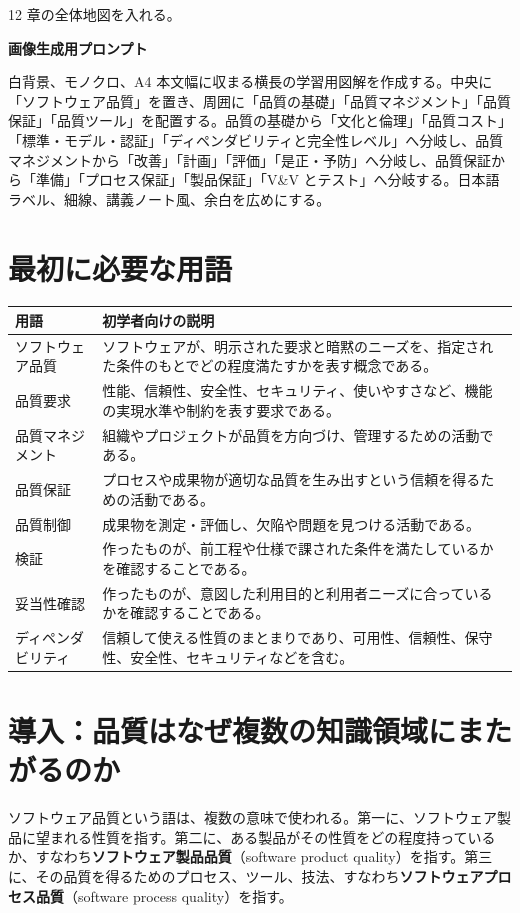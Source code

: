 \documentclass[11pt,a4paper]{article}
\newcommand{\term}[2]{\textbf{#1}（#2）}
\begin{document}
\begin{todobox}
12 章の全体地図を入れる。\par
\textbf{画像生成用プロンプト}\par
白背景、モノクロ、A4 本文幅に収まる横長の学習用図解を作成する。中央に「ソフトウェア品質」を置き、周囲に「品質の基礎」「品質マネジメント」「品質保証」「品質ツール」を配置する。品質の基礎から「文化と倫理」「品質コスト」「標準・モデル・認証」「ディペンダビリティと完全性レベル」へ分岐し、品質マネジメントから「改善」「計画」「評価」「是正・予防」へ分岐し、品質保証から「準備」「プロセス保証」「製品保証」「V\&V とテスト」へ分岐する。日本語ラベル、細線、講義ノート風、余白を広めにする。
\end{todobox}

\section*{最初に必要な用語}

\noindent\begin{tabularx}{\textwidth}{L{0.27\textwidth}Y}
\toprule
\textbf{用語} & \textbf{初学者向けの説明} \\
\midrule
ソフトウェア品質 & ソフトウェアが、明示された要求と暗黙のニーズを、指定された条件のもとでどの程度満たすかを表す概念である。 \\
品質要求 & 性能、信頼性、安全性、セキュリティ、使いやすさなど、機能の実現水準や制約を表す要求である。 \\
品質マネジメント & 組織やプロジェクトが品質を方向づけ、管理するための活動である。 \\
品質保証 & プロセスや成果物が適切な品質を生み出すという信頼を得るための活動である。 \\
品質制御 & 成果物を測定・評価し、欠陥や問題を見つける活動である。 \\
検証 & 作ったものが、前工程や仕様で課された条件を満たしているかを確認することである。 \\
妥当性確認 & 作ったものが、意図した利用目的と利用者ニーズに合っているかを確認することである。 \\
ディペンダビリティ & 信頼して使える性質のまとまりであり、可用性、信頼性、保守性、安全性、セキュリティなどを含む。 \\
\bottomrule
\end{tabularx}


\section*{導入：品質はなぜ複数の知識領域にまたがるのか}
ソフトウェア品質という語は、複数の意味で使われる。第一に、ソフトウェア製品に望まれる性質を指す。第二に、ある製品がその性質をどの程度持っているか、すなわち\term{ソフトウェア製品品質}{software product quality}を指す。第三に、その品質を得るためのプロセス、ツール、技法、すなわち\term{ソフトウェアプロセス品質}{software process quality}を指す。
\end{document}
